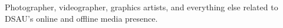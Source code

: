 
Photographer, videographer, graphics artists, and everything else related to DSAU's online and
offline media presence.
